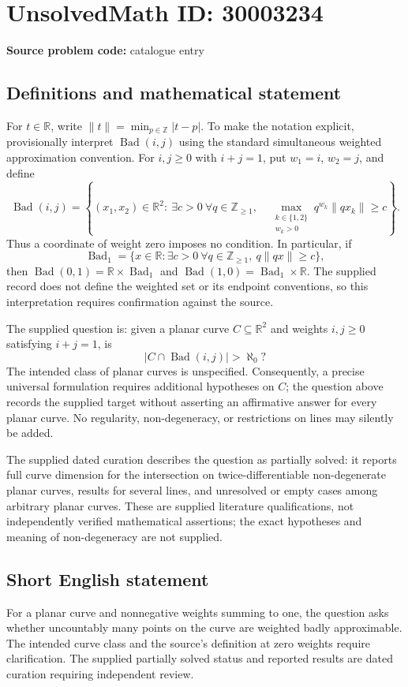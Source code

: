 \documentclass[11pt]{article}
\newcommand{\Z}{\mathbb{Z}}
\newcommand{\R}{\mathbb{R}}
\begin{document}
\section*{UnsolvedMath ID: 30003234}
\textbf{Source problem code:} catalogue entry
\subsection{Definitions and mathematical statement}
For \(t\in\R\), write \(\|t\|=\min_{p\in\Z}|t-p|\). To make the notation explicit, provisionally interpret \(\operatorname{Bad}(i,j)\) using the standard simultaneous weighted approximation convention. For \(i,j\geq0\) with \(i+j=1\), put \(w_1=i\), \(w_2=j\), and define
\[
\operatorname{Bad}(i,j)=\left\{(x_1,x_2)\in\R^2:\ \exists c>0\ \forall q\in\Z_{\geq1},\quad \max_{\substack{k\in\{1,2\}\\w_k>0}}q^{w_k}\|qx_k\|\geq c\right\}.
\]
Thus a coordinate of weight zero imposes no condition. In particular, if
\[
\operatorname{Bad}_1=\{x\in\R:\exists c>0\ \forall q\in\Z_{\geq1},\ q\|qx\|\geq c\},
\]
then \(\operatorname{Bad}(0,1)=\R\times\operatorname{Bad}_1\) and \(\operatorname{Bad}(1,0)=\operatorname{Bad}_1\times\R\). The supplied record does not define the weighted set or its endpoint conventions, so this interpretation requires confirmation against the source.

The supplied question is: given a planar curve \(C\subseteq\R^2\) and weights \(i,j\geq0\) satisfying \(i+j=1\), is
\[
\bigl|C\cap\operatorname{Bad}(i,j)\bigr|>\aleph_0?
\]
The intended class of planar curves is unspecified. Consequently, a precise universal formulation requires additional hypotheses on \(C\); the question above records the supplied target without asserting an affirmative answer for every planar curve. No regularity, non-degeneracy, or restrictions on lines may silently be added.

The supplied dated curation describes the question as partially solved: it reports full curve dimension for the intersection on twice-differentiable non-degenerate planar curves, results for several lines, and unresolved or empty cases among arbitrary planar curves. These are supplied literature qualifications, not independently verified mathematical assertions; the exact hypotheses and meaning of non-degeneracy are not supplied.
\subsection{Short English statement}
For a planar curve and nonnegative weights summing to one, the question asks whether uncountably many points on the curve are weighted badly approximable. The intended curve class and the source's definition at zero weights require clarification. The supplied partially solved status and reported results are dated curation requiring independent review.
\end{document}
